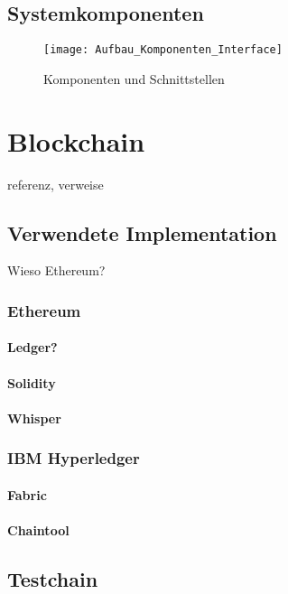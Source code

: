 \subsection{Systemkomponenten}

\begin{figure}
\centering
\texttt{[image: Aufbau\_Komponenten\_Interface]}
\caption{Komponenten und Schnittstellen}
\label{fig:Aufbau Komponenten und Schnittstellen}
\end{figure}



\section{Blockchain}
\label{sec:Blockchain}
referenz, verweise

\subsection{Verwendete Implementation}
Wieso Ethereum?

\subsubsection{Ethereum}
\paragraph{Ledger?}
\paragraph{Solidity}
\paragraph{Whisper}
\subsubsection{IBM Hyperledger}
\paragraph{Fabric}
\paragraph{Chaintool}

\subsection{Testchain}

